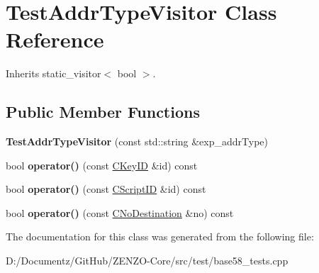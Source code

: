 \hypertarget{class_test_addr_type_visitor}{}\section{Test\+Addr\+Type\+Visitor Class Reference}
\label{class_test_addr_type_visitor}


Inherits static\+\_\+visitor$<$ bool $>$.

\subsection*{Public Member Functions}
\begin{DoxyCompactItemize}
\item 
\mbox{\label{class_test_addr_type_visitor_ae60ae920ab6c864c5543a9a795fde74a}} 
{\bfseries Test\+Addr\+Type\+Visitor} (const std\+::string \&exp\+\_\+addr\+Type)
\item 
\mbox{\label{class_test_addr_type_visitor_a9ee55bb56a6f5a8910c4913db7e66924}} 
bool {\bfseries operator()} (const \mbox{\hyperlink{class_c_key_i_d}{C\+Key\+ID}} \&id) const
\item 
\mbox{\label{class_test_addr_type_visitor_a62c5864d0b089a969158c08f64c321f6}} 
bool {\bfseries operator()} (const \mbox{\hyperlink{class_c_script_i_d}{C\+Script\+ID}} \&id) const
\item 
\mbox{\label{class_test_addr_type_visitor_af4326f111cf9977e02593edea996afba}} 
bool {\bfseries operator()} (const \mbox{\hyperlink{class_c_no_destination}{C\+No\+Destination}} \&no) const
\end{DoxyCompactItemize}


The documentation for this class was generated from the following file\+:\begin{DoxyCompactItemize}
\item 
D\+:/\+Documentz/\+Git\+Hub/\+Z\+E\+N\+Z\+O-\/\+Core/src/test/base58\+\_\+tests.\+cpp\end{DoxyCompactItemize}
